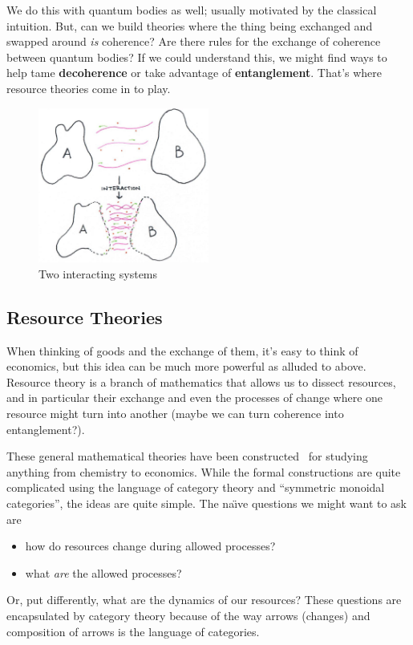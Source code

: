 \documentclass[11pt,english]{article}
\theoremstyle{definition}
\begin{document}
We do this with quantum bodies as well; usually motivated by the classical intuition. But, can we build theories where the thing being exchanged and swapped around \emph{is} coherence? Are there rules for the exchange of coherence between quantum bodies? If we could understand this, we might find ways to help tame \textbf{decoherence} or take advantage of \textbf{entanglement}. That's where resource theories come in to play.

\begin{figure}[h!]
	\begin{center}
		\includegraphics[width=0.5\textwidth]{interaction.jpeg}
		\caption{Two interacting systems}\label{fig:interacting-systems}
	\end{center}
\end{figure}


\subsection{Resource Theories}
When thinking of goods and the exchange of them, it's easy to think of economics, but this idea can be much more powerful as alluded to above. Resource theory is a branch of mathematics that allows us to dissect resources, and in particular their exchange and even the processes of change where one resource might turn into another (maybe we can turn coherence into entanglement?).

These general mathematical theories have been constructed~\cite{mathematical-resources,resource-theory} for studying anything from chemistry to economics. While the formal constructions are quite complicated using the language of category theory and ``symmetric monoidal categories'', the ideas are quite simple. The na\"\i ve questions we might want to ask are
\begin{itemize}
	\item how do resources change during allowed processes?
	\item what \emph{are} the allowed processes?
\end{itemize}
Or, put differently, what are the dynamics of our resources? These questions are encapsulated by category theory because of the way arrows (changes) and composition of arrows is the language of categories.
\end{document}
